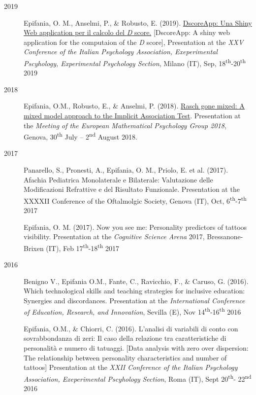 \documentclass[letterpaper,12pt]{article}
\begin{document}
\begin{description}
	\item[2019] 
	\item[] 	Epifania, O. M., Anselmi, P., \& Robusto, E. (2019). \href{https://ottaviae.github.io/presentations/2019/aip_slides.html#1}{DscoreApp: Una Shiny Web application per il calcolo del \emph{D} score.}  [DscoreApp: A shiny web application for the computaion of the \emph{D} score], Presentation at the \emph{XXV Conference of the Italian Psychology Association, Exeperimental Pscyhology, Experimental Psychology Section}, Milano (IT), Sep, 18\textsuperscript{th}-20\textsuperscript{th} 2019
	
	\item[2018] 
	\item[] 	Epifania, O.M., Robusto, E., \& Anselmi, P. (2018). \href{https://ottaviae.github.io/presentations/2018/empg2018.pdf}{Rasch gone mixed: A mixed model approach to the Implicit Association Test}. Presentation at the \emph{Meeting of the European Mathematical Psychology Group 2018}, Genova, 30\textsuperscript{th} July – 2\textsuperscript{nd} August 2018.
	
		\item[2017] 
	\item[] 	Panarello, S., Pronesti, A., Epifania, O. M., Priolo, E. et al. (2017). Afachia Pediatrica Monolaterale e Bilaterale: Valutazione delle Modificazioni Refrattive e del Risultato Funzionale. Presentation at the XXXXII Conference of the Oftalmolgic Society, Genova (IT), Oct, 6\textsuperscript{th}-7\textsuperscript{th} 2017
	
	\item[] 	Epifania, O. M. (2017). Now you see me: Personality predictors of tattoos visibility. Presentation at the \emph{Cognitive Science Arena} 2017, Bressanone-Brixen (IT), Feb 17\textsuperscript{th}-18\textsuperscript{th} 2017
	
		\item[2016] 
	\item[] 	Benigno V., Epifania O.M., Fante, C., Ravicchio, F., \& Caruso, G. (2016). Which technological skills and teaching strategies for inclusive education: Synergies and discordances. Presentation at the \emph{International Conference of Education, Research, and Innovation}, Sevilla (E), Nov  14\textsuperscript{th}-16\textsuperscript{th} 2016
	
	\item[] 	Epifania, O.M., \& Chiorri, C. (2016). L’analisi di variabili di conto con sovrabbondanza di zeri: Il caso della relazione tra caratteristiche di personalità e numero di tatuaggi. [Data analysis with zero over dispersion: The relationship between personality characteristics and number of tattoos] Presentation at the \emph{XXII Conference of the Italian Psychology Association, Exeperimental Pscyhology Section}, Roma (IT), Sept 20\textsuperscript{th}- 22\textsuperscript{nd} 2016
	
\end{description}
\end{document}
